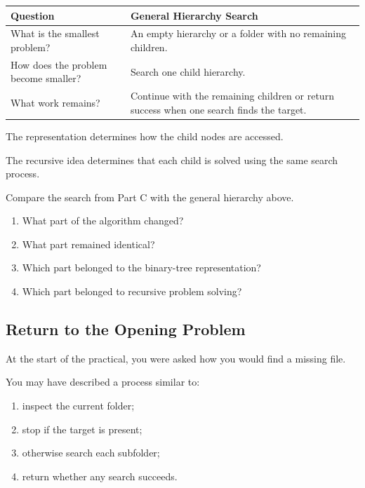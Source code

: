 \documentclass{csc2059practical}
\begin{document}
\begin{center}
\begin{tabular}{p{} p{}}
\toprule
\textbf{Question} & \textbf{General Hierarchy Search} \\
\midrule
What is the smallest problem? &
An empty hierarchy or a folder with no remaining children. \\
How does the problem become smaller? &
Search one child hierarchy. \\
What work remains? &
Continue with the remaining children or return success when one search finds
the target. \\
\bottomrule
\end{tabular}
\end{center}

The representation determines how the child nodes are accessed.

The recursive idea determines that each child is solved using the same search
process.

\begin{reflectionbox}
Compare the search from Part C with the general hierarchy above.

\begin{enumerate}
    \item What part of the algorithm changed?
    \item What part remained identical?
    \item Which part belonged to the binary-tree representation?
    \item Which part belonged to recursive problem solving?
\end{enumerate}
\end{reflectionbox}

\subsection{Return to the Opening Problem}

At the start of the practical, you were asked how you would find a missing file.

You may have described a process similar to:

\begin{enumerate}
    \item inspect the current folder;
    \item stop if the target is present;
    \item otherwise search each subfolder;
    \item return whether any search succeeds.
\end{enumerate}
\end{document}
